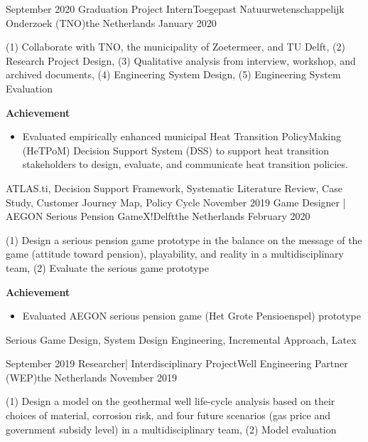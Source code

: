 %
%
%
\begin{experiences}
  \experience
    {September 2020}   {Graduation Project Intern}{Toegepast Natuurwetenschappelijk Onderzoek (TNO)}{the Netherlands}
    {January 2020} { (1) Collaborate with TNO, the municipality of Zoetermeer, and TU Delft, (2) Research Project Design, (3) Qualitative analysis from interview, workshop, and archived documents, (4) Engineering System Design, (5) Engineering System Evaluation

\textbf{Achievement}    
                      \begin{itemize}
                        \item Evaluated empirically enhanced municipal Heat Transition PolicyMaking (HeTPoM) Decision Support System (DSS) to support heat transition stakeholders to design, evaluate, and communicate heat transition policies.                                     
                      \end{itemize}
                    }
                    {ATLAS.ti, Decision Support Framework, Systematic Literature Review, Case Study, Customer Journey Map, Policy Cycle}
  \emptySeparator
  \experience
    {November 2019} {Game Designer | AEGON Serious Pension Game}{X!Delft}{the Netherlands}
    {February 2020} { (1) Design a serious pension game prototype in the balance on the message of the game (attitude toward pension), playability, and reality in a multidisciplinary team, (2) Evaluate the serious game prototype
    
    
\textbf{Achievement}    
                      \begin{itemize}
                        \item Evaluated AEGON serious pension game (Het Grote Pensioenspel) prototype                          

                      \end{itemize}
                    }
                    {Serious Game Design, System Design Engineering, Incremental Approach, Latex}
  \emptySeparator

    \experience
    {September 2019}     {Researcher| Interdisciplinary Project}{Well Engineering Partner (WEP)}{the Netherlands}
    {November 2019} { (1) Design a model on the geothermal well life-cycle analysis based on their choices of material, corrosion risk, and four future scenarios (gas price and government subsidy level) in a multidisciplinary team, (2) Model evaluation
    
}
\end{experiences}
